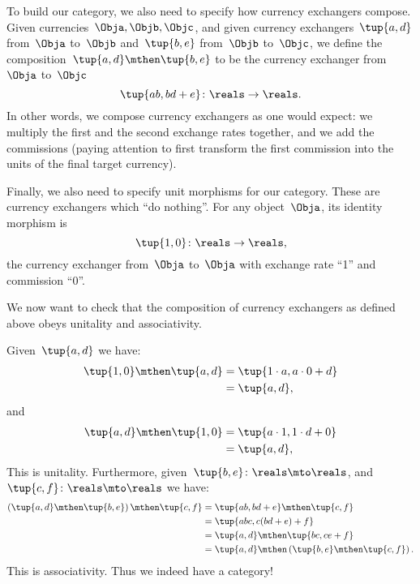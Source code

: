 To build our category, we also need to specify how currency exchangers compose.
Given currencies~$\Obja, \Objb, \Objc$, and given currency exchangers~$\tup{a,d}$ from~$\Obja$ to~$\Objb$ and~$\tup{b,e}$ from~$\Objb$ to~$\Objc$,
we define the composition~$\tup{a,d} \mthen \tup{b,e}$ to be the currency exchanger from~$\Obja$ to~$\Objc$
\begin{equation}
    \label{eq:comp-law-curr}
    \tup{ab,bd+e} \colon \reals \to \reals.
\end{equation}
In other words, we compose currency exchangers as one would expect: we multiply the first and the second exchange rates together, and we add the commissions (paying attention to first transform the first commission into the units of the final target currency).

Finally, we also need to specify unit morphisms for our category.
These are currency exchangers which ``do nothing''.
For any object~$\Obja$, its identity morphism is
\begin{equation*}
    \tup{1,0} \colon \reals \to \reals,
\end{equation*}
the currency exchanger from~$\Obja$ to~$\Obja$ with exchange rate ``1'' and commission ``0''.

We now want to check that the composition of currency exchangers as defined above obeys unitality and associativity.

Given~$\tup{a,d}$ we have:
\begin{equation*}
    \begin{aligned}
        \tup{1,0}\mthen\tup{a,d} & =\tup{1\cdot a, a\cdot 0+d} \\
                                 & =\tup{a,d},
    \end{aligned}
\end{equation*}
and
\begin{equation*}
    \begin{aligned}
        \tup{a,d}\mthen \tup{1,0} & =\tup{a\cdot 1, 1\cdot d+0} \\
                                  & =\tup{a,d},
    \end{aligned}
\end{equation*}
This is unitality.
Furthermore, given~$\tup{b,e}\colon \reals \mto \reals$, and~$\tup{c,f}\colon \reals \mto \reals$ we have:
\begin{equation*}
    \begin{aligned}
        \left( \tup{a,d}\mthen \tup{b,e}\right)\mthen \tup{c,f} & =\tup{ab,bd+e}\mthen \tup{c,f}                            \\
                                                                & =\tup{abc,c(bd+e)+f}                                      \\
                                                                & =\tup{a,d}\mthen \tup{bc,ce+f}                            \\
                                                                & =\tup{a,d}\mthen \left( \tup{b,e}\mthen \tup{c,f}\right).
    \end{aligned}
\end{equation*}
This is associativity.
Thus we indeed have a category!

